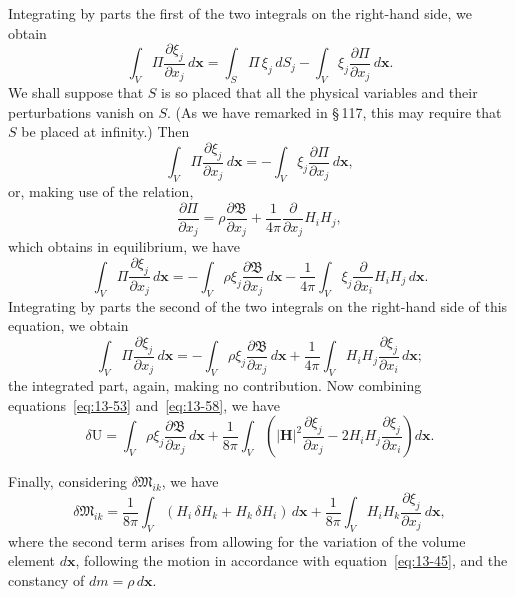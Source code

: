 Integrating by parts the first of the two integrals on the right-hand side, we obtain
\begin{equation}
\label{eq:13-54}
\int_V \Pi\frac{\partial\xi_j}{\partial x_j}\,d\mathbf{x} = \int_S \Pi\,\xi_j\,dS_j - \int_V \xi_j\frac{\partial\Pi}{\partial x_j}\,d\mathbf{x}.
\end{equation}
We shall suppose that $S$ is so placed that all the physical variables and their perturbations vanish on $S$. (As we have remarked in \S\,117, this may require that $S$ be placed at infinity.) Then
\begin{equation}
\label{eq:13-55}
\int_V \Pi\frac{\partial\xi_j}{\partial x_j}\,d\mathbf{x} = -\int_V \xi_j\frac{\partial\Pi}{\partial x_j}\,d\mathbf{x},
\end{equation}
or, making use of the relation,
\begin{equation}
\label{eq:13-56}
\frac{\partial\Pi}{\partial x_j} = \rho\frac{\partial\mathfrak{B}}{\partial x_j} + \frac{1}{4\pi}\frac{\partial}{\partial x_j}H_i H_j,
\end{equation}
which obtains in equilibrium, we have
\begin{equation}
\label{eq:13-57}
\int_V \Pi\frac{\partial\xi_j}{\partial x_j}\,d\mathbf{x} = -\int_V \rho\xi_j\frac{\partial\mathfrak{B}}{\partial x_j}\,d\mathbf{x} - \frac{1}{4\pi}\int_V \xi_j\frac{\partial}{\partial x_i}H_i H_j\,d\mathbf{x}.
\end{equation}
Integrating by parts the second of the two integrals on the right-hand side of this equation, we obtain
\begin{equation}
\label{eq:13-58}
\int_V \Pi\frac{\partial\xi_j}{\partial x_j}\,d\mathbf{x} = -\int_V \rho\xi_j\frac{\partial\mathfrak{B}}{\partial x_j}\,d\mathbf{x} + \frac{1}{4\pi}\int_V H_i H_j\frac{\partial\xi_j}{\partial x_i}\,d\mathbf{x};
\end{equation}
the integrated part, again, making no contribution. Now combining equations~\eqref{eq:13-53} and~\eqref{eq:13-58}, we have
\begin{equation}
\label{eq:13-59}
\delta\mathrm{U} = \int_V \rho\xi_j\frac{\partial\mathfrak{B}}{\partial x_j}\,d\mathbf{x} + \frac{1}{8\pi}\int_V\!\left(|\mathbf{H}|^2\frac{\partial\xi_j}{\partial x_j} - 2H_i H_j\frac{\partial\xi_j}{\partial x_i}\right)d\mathbf{x}.
\end{equation}

Finally, considering $\delta\mathfrak{M}_{ik}$, we have
\begin{equation}
\label{eq:13-60}
\delta\mathfrak{M}_{ik} = \frac{1}{8\pi}\int_V (H_i\,\delta H_k + H_k\,\delta H_i)\,d\mathbf{x} + \frac{1}{8\pi}\int_V H_i H_k\frac{\partial\xi_j}{\partial x_j}\,d\mathbf{x},
\end{equation}
where the second term arises from allowing for the variation of the volume element $d\mathbf{x}$, following the motion in accordance with equation~\eqref{eq:13-45}, and the constancy of $dm = \rho\,d\mathbf{x}$.

